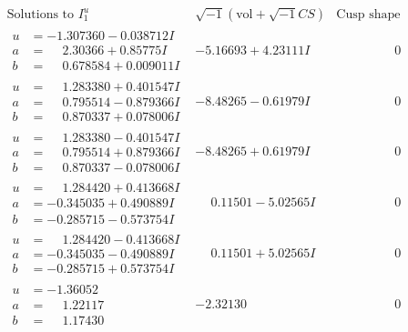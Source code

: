 \documentclass[1p]{elsarticle_modified}
\theoremstyle{definition}
\newcommand{\I}{\sqrt{-1}}
\begin{document}
$$\begin{array}{c|c|c}
\text{Solutions to }I^u_{1}& \I (\text{vol} + \sqrt{-1}CS) & \text{Cusp shape}\\
 \hline 
\begin{aligned}
u &= -1.307360 - 0.038712 I \\
a &= \phantom{-}2.30366 + 0.85775 I \\
b &= \phantom{-}0.678584 + 0.009011 I\end{aligned}
 & -5.16693 + 4.23111 I & \phantom{-0.000000 } 0 \\ \hline\begin{aligned}
u &= \phantom{-}1.283380 + 0.401547 I \\
a &= \phantom{-}0.795514 - 0.879366 I \\
b &= \phantom{-}0.870337 + 0.078006 I\end{aligned}
 & -8.48265 - 0.61979 I & \phantom{-0.000000 } 0 \\ \hline\begin{aligned}
u &= \phantom{-}1.283380 - 0.401547 I \\
a &= \phantom{-}0.795514 + 0.879366 I \\
b &= \phantom{-}0.870337 - 0.078006 I\end{aligned}
 & -8.48265 + 0.61979 I & \phantom{-0.000000 } 0 \\ \hline\begin{aligned}
u &= \phantom{-}1.284420 + 0.413668 I \\
a &= -0.345035 + 0.490889 I \\
b &= -0.285715 - 0.573754 I\end{aligned}
 & \phantom{-}0.11501 - 5.02565 I & \phantom{-0.000000 } 0 \\ \hline\begin{aligned}
u &= \phantom{-}1.284420 - 0.413668 I \\
a &= -0.345035 - 0.490889 I \\
b &= -0.285715 + 0.573754 I\end{aligned}
 & \phantom{-}0.11501 + 5.02565 I & \phantom{-0.000000 } 0 \\ \hline\begin{aligned}
u &= -1.36052\phantom{ +0.000000I} \\
a &= \phantom{-}1.22117\phantom{ +0.000000I} \\
b &= \phantom{-}1.17430\phantom{ +0.000000I}\end{aligned}
 & -2.32130\phantom{ +0.000000I} & \phantom{-0.000000 } 0 \\ \hline\begin{aligned}

\end{aligned}
\end{array}$$
\end{document}
